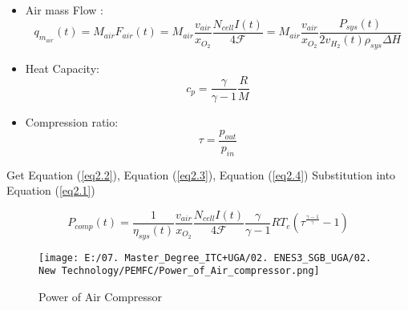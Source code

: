 \documentclass[12pt,a4paper]{article}
\numberwithin{equation}{section}
\begin{document}
{\begin{itemize}
	\item Air mass Flow : 
		\begin{equation}
			q_{m_{air}}(t) = M_{air}F_{air}(t) = M_{air} \frac{v_{air}}{x_{O_2}}\frac{N_{cell}I(t)}{4\mathscr{F}} = M_{air} \frac{v_{air}}{x_{O_2}}\frac{P_{sys}(t)}{2v_{H_2}(t)\rho_{sys}\Delta H} 
			\label{eq2.2}
		\end{equation}
	\item Heat Capacity:
		\begin{equation}
			c_p =\frac{\gamma}{\gamma-1}\frac{R}{M} \label{eq2.3}
		\end{equation}
	\item Compression ratio:
		\begin{equation}
			\tau = \frac{\textit{p}_{out}}{\textit{p}_{in}} \label{eq2.4}
		\end{equation}
\end{itemize}

Get Equation (\ref{eq2.2}), Equation (\ref{eq2.3}), Equation (\ref{eq2.4}) Substitution into Equation (\ref{eq2.1})

\begin{equation}
	P_{comp}(t) = \frac{1}{\eta_{sys}(t)} \frac{v_{air}}{x_{O_2}}\frac{N_{cell}I(t)}{4\mathscr{F}} \frac{\gamma}{\gamma-1}RT_e(\tau^{\frac{\gamma-1}{\gamma}}-1)\label{eq2.5}
\end{equation}

\begin{figure}[h]
	\centering 
	\texttt{[image: E:/07. Master\_Degree\_ITC+UGA/02. ENES3\_SGB\_UGA/02. New Technology/PEMFC/Power\_of\_Air\_compressor.png]}
	\caption{\small {Power of Air Compressor}}
	\label{15}
\end{figure}

}
\end{document}
